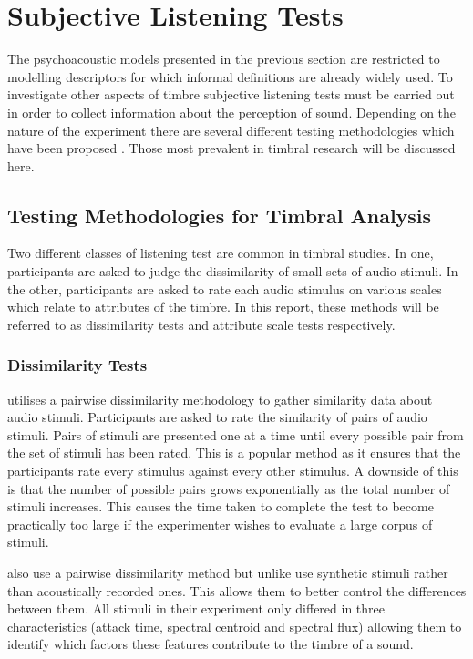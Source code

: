 \section{Subjective Listening Tests}
\label{sec:Timbre-ListeningTests}
	The psychoacoustic models presented in the previous section are restricted to modelling descriptors for which
	informal definitions are already widely used. To investigate other aspects of timbre subjective listening tests
	must be carried out in order to collect information about the perception of sound. Depending on the nature of the
	experiment there are several different testing methodologies which have been proposed \citep{bech2006perceptual}.
	Those most prevalent in timbral research will be discussed here.

	\subsection{Testing Methodologies for Timbral Analysis}
	\label{sec:Timbre-ListeningTests-Methods}
		Two different classes of listening test are common in timbral studies. In one, participants are asked to
		judge the dissimilarity of small sets of audio stimuli. In the other, participants are asked to rate each
		audio stimulus on various scales which relate to attributes of the timbre. In this report, these methods
		will be referred to as dissimilarity tests and attribute scale tests respectively.

		\subsubsection*{Dissimilarity Tests}
			\citet{grey1977multidimensional} utilises a pairwise dissimilarity methodology to gather similarity
			data about audio stimuli. Participants are asked to rate the similarity of pairs of audio stimuli.
			Pairs of stimuli are presented one at a time until every possible pair from the set of stimuli has
			been rated. This is a popular method as it ensures that the participants rate every stimulus
			against every other stimulus. A downside of this is that the number of possible pairs grows
			exponentially as the total number of stimuli increases. This causes the time taken to complete the
			test to become practically too large if the experimenter wishes to evaluate a large corpus of
			stimuli.

			\citet{caclin2005acoustic} also use a pairwise dissimilarity method but unlike
			\citet{grey1977multidimensional} use synthetic stimuli rather than acoustically recorded ones. This
			allows them to better control the differences between them. All stimuli in their experiment only
			differed in three characteristics (attack time, spectral centroid and spectral flux) allowing them
			to identify which factors these features contribute to the timbre of a sound.

